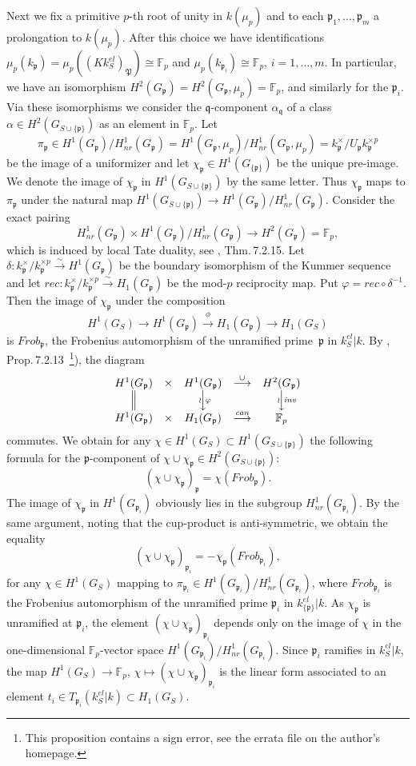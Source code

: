 \documentclass[10pt]{article}
\def\mapr#1{\stackrel{#1}{\longrightarrow}}
\def\mapd#1{\Big\downarrow\rlap {$\vcenter{\hbox{$\scriptstyle{{#1}}$}}$}}
\def\eqd{\Big\|}
\newcommand{\F}{{\mathbb F}}
\newcommand{\Frob}{{\mathit{Frob}}}
\newcommand{\p}{{\mathfrak p}}
\newcommand{\q}{{\mathfrak q}}
\newcommand{\nr}{\mathit{nr}}
\renewcommand{\P}{\mathfrak{P}}
\theoremstyle{alex}
\theoremstyle{alexdef}
\begin{document}
\medskip\noindent
Next we fix a primitive $p$-th root of unity in $k(\mu_p)$ and to each $\p_1,\ldots,\p_m$ a prolongation to $k(\mu_p)$. After this choice we have identifications $\mu_p(k_\p)=\mu_p((Kk_S^{el})_\P)\cong \F_p$ and $\mu_p(k_{\p_i})\cong \F_p$, $i=1,\ldots, m$.
In particular, we have an isomorphism $H^2(G_\p)=H^2(G_\p, \mu_p)=\F_p$, and similarly for the $\p_i$. Via these isomorphisms we consider the $\q$-component $\alpha_\q$ of a class $\alpha\in H^2(G_{S\cup\{\p\}})$ as an element in $\F_p$.
Let
\[
\pi_\p \in H^1(G_\p)/H^1_\nr(G_\p)= H^1(G_\p,\mu_p)/H^1_\nr(G_\p,\mu_p)= k_\p^\times/U_\p k_\p^{\times p}
\]
be the image of a uniformizer and let $\chi_\p\in H^1(G_{\{\p\}})$ be the unique pre-image. We denote the image of $\chi_\p$ in $H^1(G_{S\cup \{\p\}})$ by the same letter. Thus $\chi_\p$ maps to $\pi_\p$ under the natural map $H^1(G_{S\cup \{\p\}}) \to H^1(G_\p)/H^1_\nr(G_\p)$.
Consider the exact pairing
\[
H^1_\nr(G_\p) \times H^1(G_\p)/H^1_\nr(G_\p) \to H^2(G_\p)=\F_p,
\]
which is induced by local Tate duality, see \cite{NSW}, Thm.\,7.2.15. Let $\delta: k_\p^\times/k_\p^{\times p} \stackrel{\sim}{\to} H^1(G_\p)$ be the boundary isomorphism of the Kummer sequence and let $\mathit{rec}: k_\p^\times/k_\p^{\times p} \stackrel{\sim}{\to} H_1(G_\p)$ be the mod-$p$ reciprocity map. Put $\varphi= \mathit{rec}\circ \delta^{-1}$. Then the image of $\chi_\p$ under the composition
\[
H^1(G_S) \mapr{} H^1(G_\p) \mapr{\phi} H_1(G_\p) \mapr{} H_1(G_S)
\]
is $\Frob_\p$, the Frobenius automorphism of the unramified prime~$\p$ in $k_S^{el}|k$.
By  \cite{NSW}, Prop.\,7.2.13\ \footnote{This proposition contains a sign error, see the errata file on the author's homepage.}), the diagram
\[
\begin{array}{ccccc}
H^1(G_\p)&\times & H^1(G_\p)&\mapr{\cup}&H^2(G_\p)\\
\eqd&&\mapd{\hspace{-7pt} \wr \ \varphi}&&\mapd{\hspace{-7pt}\wr \ \mathit{inv}}\\
H^1(G_\p)&\times & H_1(G_\p)&\mapr{\mathit{can}}&\F_p
\end{array}
\]
commutes.
We obtain for any $\chi\in H^1(G_S)\subset H^1(G_{S\cup \{\p\}})$ the following formula for the $\p$-component of $\chi\cup \chi_\p \in H^2(G_{S\cup\{\p\}})$:
\[
(\chi\cup \chi_\p)_\p= \chi(\Frob_\p).
\]
The image of $\chi_\p$ in $H^1 (G_{\p_i})$ obviously lies in the subgroup $H^1_\nr (G_{\p_i})$. By the same argument, noting that the cup-product is anti-symmetric, we obtain the equality
\[
(\chi \cup \chi_\p)_{\p_i}= -\chi_\p(\Frob_{\p_i}),
\]
for any $\chi\in H^1(G_S)$ mapping to $\pi_{\p_i}\in H^1(G_{\p_i})/H^1_\nr(G_{\p_i})$, where $\Frob_{\p_i}$ is the Frobenius automorphism of the unramified prime $\p_i$ in $k_{\{\p\}}^{el}|k$. As $\chi_\p$ is unramified at $\p_i$, the element $(\chi \cup \chi_\p)_{\p_i}$ depends only on the image of $\chi$ in the one-dimensional $\F_p$-vector space $H^1(G_{\p_i})/H^1_{nr}(G_{\p_i})$.  Since  $\p_i$ ramifies in $k_S^{el}|k$, the map $H^1(G_S)\to \F_p$,  $\chi \mapsto (\chi \cup \chi_\p)_{\p_i}$ is the linear form associated to an element $t_i \in T_{\p_i}(k_S^{el}|k)\subset H_1(G_S)$.
\end{document}
